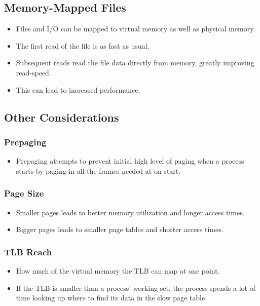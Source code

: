 \documentclass[a4wide,10pt]{article}
\begin{document}
\subsection{Memory-Mapped Files} %
\label{sub:memory_mapped_files}
\begin{itemize}
	\item Files and I/O can be mapped to virtual memory as well as physical memory.
	\item The first read of the file is as fast as usual.
	\item Subsequent reads read the file data directly from memory, greatly improving read-speed.
	\item This can lead to increased performance.
\end{itemize}

\addtocounter{subsection}{1}
\subsection{Other Considerations} %
\label{sub:other_considerations}
	\subsubsection{Prepaging} %
	\label{ssub:prepaging}
	\begin{itemize}
		\item Prepaging attempts to prevent initial high level of paging when a process starts by paging in all the frames needed at on start.
	\end{itemize}
	
	\subsubsection{Page Size} %
	\label{ssub:page_size}
	\begin{itemize}
		\item Smaller pages leads to better memory utilization and longer access times.
		\item Bigger pages leads to smaller page tables and shorter access times.
	\end{itemize}
	
	\subsubsection{TLB Reach} %
	\label{ssub:tlb_reach}
	\begin{itemize}
		\item How much of the virtual memory the TLB can map at one point.
		\item If the TLB is smaller than a process' working set, the process spends a lot of time looking up where to find its data in the slow page table.
	\end{itemize}
	
\end{document}
